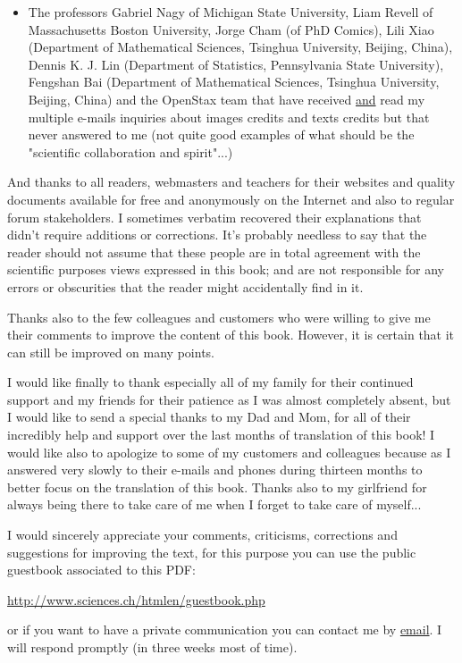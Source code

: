 \begin{itemize}
		\item The professors Gabriel Nagy of Michigan State University, Liam Revell of Massachusetts Boston University, Jorge Cham (of PhD Comics), Lili Xiao (Department of Mathematical Sciences, Tsinghua University, Beijing, China), Dennis K. J. Lin (Department of Statistics, Pennsylvania State University), Fengshan Bai (Department of Mathematical Sciences, Tsinghua University, Beijing, China) and the OpenStax team that have received \underline{and} read my multiple e-mails inquiries about images credits and texts credits but that never answered to me (not quite good examples of what should be the "scientific collaboration and spirit"...)
	\end{itemize}
	
	And thanks to all readers, webmasters and teachers for their websites and quality documents available for free and anonymously on the Internet and also to regular forum stakeholders. I sometimes verbatim recovered their explanations that didn't require additions or corrections. It's probably needless to say that the reader should not assume that these people are in total agreement with the scientific purposes views expressed in this book; and are not responsible for any errors or obscurities that the reader might accidentally find in it.
	
	Thanks also to the few colleagues and customers who were willing to give me their comments to improve the content of this book. However, it is certain that it can still be improved on many points.
	
	I would like finally to thank especially all of my family for their continued support and my friends for their patience as I was almost completely absent, but I would like to send a special thanks to my Dad and Mom, for all of their incredibly help and support over the last months of translation of this book! I would like also to apologize to some of my customers and colleagues because as I answered very slowly to their e-mails and phones during thirteen months to better focus on the translation of this book. Thanks also to my girlfriend for always being there to take care of me when I forget to take care of myself...
	
	I would sincerely appreciate your comments, criticisms, corrections and suggestions for improving the text, for this purpose you can use the public guestbook associated to this PDF:
	\begin{center}
	\url{http://www.sciences.ch/htmlen/guestbook.php}
	\end{center}
	or if you want to have a private communication you can contact me by {\href{mailto:info@sciences.ch}{{\color{blue}email}}}. I will respond promptly (in three weeks most of time).
